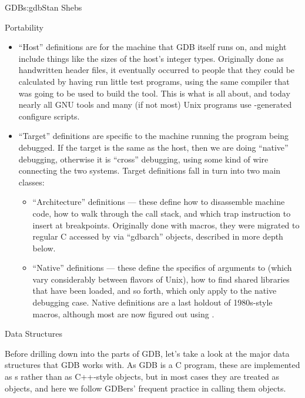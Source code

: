 \begin{aosachapter}{GDB}{s:gdb}{Stan Shebs}
\begin{aosasect1}{Portability}
\begin{itemize}
\item ``Host'' definitions are for the machine that GDB itself runs on,
and might include things like the sizes of the host's integer types.
Originally done as handwritten header files, it eventually occurred to
people that they could be calculated by having  run
little test programs, using the same compiler that was going to be
used to build the tool.  This is what
\cite{bib:autoconf} is all about, and today nearly all
GNU tools and many (if not most) Unix programs use
-generated configure scripts.

\item ``Target'' definitions are specific to the machine running the
program being debugged.  If the target is the same as the host, then
we are doing ``native'' debugging, otherwise it is ``cross''
debugging, using some kind of wire connecting the two systems.  Target
definitions fall in turn into two main classes:

\begin{itemize}
\item ``Architecture'' definitions --- these define how to disassemble machine code, how
to walk through the call stack, and which trap instruction to insert at
breakpoints.  Originally done with macros, they were migrated to
regular C accessed by via ``gdbarch'' objects, described in more depth
below.

\item ``Native'' definitions --- these define the specifics of arguments to
 (which vary considerably between flavors of Unix), how
to find shared libraries that have been loaded, and so forth, which
only apply to the native debugging case.  Native definitions are a
last holdout of 1980s-style macros, although most are now figured out
using .
\end{itemize}
\end{itemize}

\end{aosasect1}

\begin{aosasect1}{Data Structures}

Before drilling down into the parts of GDB, let's take a look at the
major data structures that GDB works with.  As GDB is a C program,
these are implemented as s rather than as C++-style
objects, but in most cases they are treated as objects, and here we
follow GDBers' frequent practice in calling them objects.


\end{aosasect1}
\end{aosachapter}
